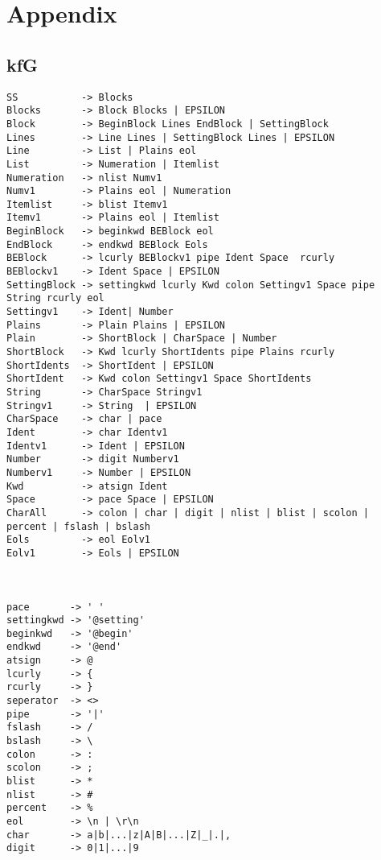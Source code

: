 \chapter{Appendix}
\section{kfG}
\label{AkfG}
\begin{lstlisting}[frame=single]
SS           -> Blocks 
Blocks       -> Block Blocks | EPSILON 
Block        -> BeginBlock Lines EndBlock | SettingBlock
Lines        -> Line Lines | SettingBlock Lines | EPSILON 
Line         -> List | Plains eol
List         -> Numeration | Itemlist 
Numeration   -> nlist Numv1 
Numv1        -> Plains eol | Numeration 
Itemlist     -> blist Itemv1 
Itemv1       -> Plains eol | Itemlist 
BeginBlock   -> beginkwd BEBlock eol
EndBlock     -> endkwd BEBlock Eols
BEBlock      -> lcurly BEBlockv1 pipe Ident Space  rcurly
BEBlockv1    -> Ident Space | EPSILON
SettingBlock -> settingkwd lcurly Kwd colon Settingv1 Space pipe String rcurly eol
Settingv1    -> Ident| Number
Plains       -> Plain Plains | EPSILON
Plain        -> ShortBlock | CharSpace | Number
ShortBlock   -> Kwd lcurly ShortIdents pipe Plains rcurly
ShortIdents  -> ShortIdent | EPSILON 
ShortIdent   -> Kwd colon Settingv1 Space ShortIdents
String       -> CharSpace Stringv1
Stringv1     -> String  | EPSILON
CharSpace    -> char | pace
Ident        -> char Identv1
Identv1      -> Ident | EPSILON
Number       -> digit Numberv1
Numberv1     -> Number | EPSILON
Kwd          -> atsign Ident
Space        -> pace Space | EPSILON
CharAll      -> colon | char | digit | nlist | blist | scolon | percent | fslash | bslash
Eols         -> eol Eolv1
Eolv1        -> Eols | EPSILON



pace       -> ' ' 
settingkwd -> '@setting'
beginkwd   -> '@begin'
endkwd     -> '@end' 
atsign     -> @
lcurly     -> { 
rcurly     -> } 
seperator  -> <> 
pipe       -> '|' 
fslash     -> /
bslash     -> \
colon      -> : 
scolon     -> ; 
blist      -> * 
nlist      -> # 
percent    -> % 
eol        -> \n | \r\n 
char       -> a|b|...|z|A|B|...|Z|_|.|,
digit      -> 0|1|...|9
\end{lstlisting}